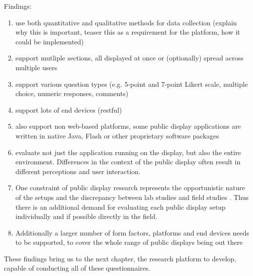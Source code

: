 	Findings: 
	\begin{enumerate}
	\item use both quantitative and qualitative methods for data collection (explain why this is important, teaser this as a requirement for the platform, how it could be implemented)

	\item support mutliple sections, all displayed at once or (optionally) spread across multiple users

	\item support various question types (e.g. 5-point and 7-point Likert scale, multiple choice, numeric responses, comments)

	\item support lots of end devices (restful)

	\item also support non web-based platforms, some public display applications are written in native Java, Flash or other proprietary software packages

	\item evaluate not just the application running on the display, but also the entire environment. Differences in the context of the public display often result in different perceptions and user interaction.

	\item 	One constraint of public display research represents the opportunistic nature of the setups and the discrepancy between lab studies and field studies \cite{Ojala2011}. Thus there is an additional demand for evaluating each public display setup individually and if possible directly in the field.

	\item Additionally a larger number of form factors, platforms and end devices needs to be supported, to cover the whole range of public displays being out there

	\end{enumerate}




	These findings bring us to the next chapter, the research platform to develop, capable of conducting all of these questionnaires.







